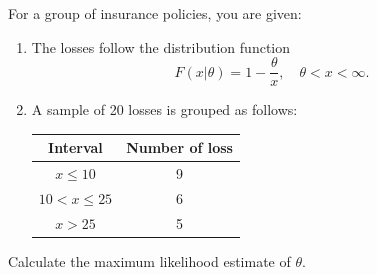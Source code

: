 \begin{example}
    For a group of insurance policies, you are given:
    \begin{enumerate}
        \item The losses follow the distribution function
        \[
            F(x|\theta) = 1 - \frac{\theta}{x}, \quad \theta < x < \infty.
        \]
        \item A sample of 20 losses is grouped as follows:
        \begin{table}[h!]
        \centering
        \begin{tabular}{|c|c|}
        \hline
        Interval & Number of loss \\
        \hline
        $x \leq 10$ & 9 \\
        $10 < x \leq 25$ & 6\\
        $x > 25$ & 5\\
        \hline
        \end{tabular}
        \end{table}
    \end{enumerate}
    Calculate the maximum likelihood estimate of $\theta$.
\end{example}

